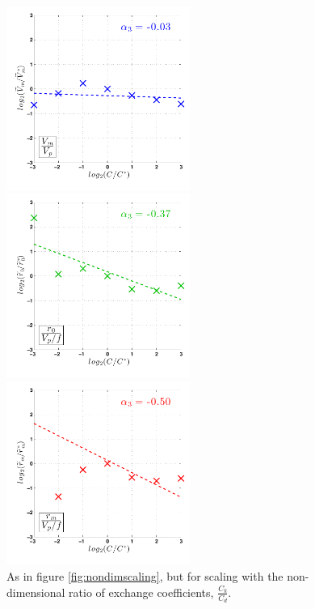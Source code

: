 \documentclass[12pt]{article}
\begin{document}
\begin{figure}[h!]
\centering
  \noindent\includegraphics[width=6cm,height=6cm]{FIGURES_TC_RCE_equilibrium_v2.0/Fig8a_CkCd_nondimensional_scaling_V.pdf}
  
  \noindent\includegraphics[width=6cm,height=6cm]{FIGURES_TC_RCE_equilibrium_v2.0/Fig8b_CkCd_nondimensional_scaling_rm.pdf}
  
  \noindent\includegraphics[width=6cm,height=6cm]{FIGURES_TC_RCE_equilibrium_v2.0/Fig8c_CkCd_nondimensional_scaling_r0.pdf}

\caption{As in figure \ref{fig:nondimscaling}, but for scaling with the non-dimensional ratio of exchange coefficients, $\frac{C_k}{C_d}$.}
\label{fig:nondimscaling_CkCd}
\end{figure}
\end{document}
